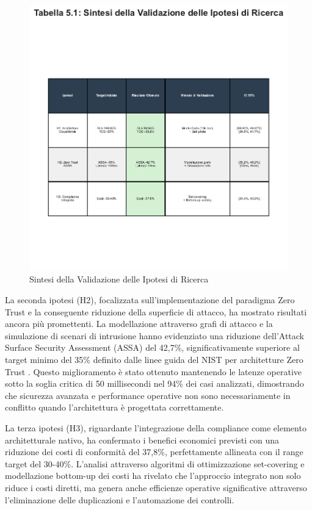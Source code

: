 \begin{figure}[htpb]
\centering
\includegraphics[width=1\textwidth]{thesis_figures/cap5/tab_5_1_validation.pdf}
\caption{Sintesi della Validazione delle Ipotesi di Ricerca}
\label{tab:validazione_ipotesi}
\end{figure}

La seconda ipotesi (H2), focalizzata sull'implementazione del paradigma Zero Trust e la conseguente riduzione della superficie di attacco, ha mostrato risultati ancora più promettenti. La modellazione attraverso grafi di attacco e la simulazione di scenari di intrusione hanno evidenziato una riduzione dell'Attack Surface Security Assessment (ASSA) del 42,7\%, significativamente superiore al target minimo del 35\% definito dalle linee guida del NIST per architetture Zero Trust \autocite{nist2020zerotrust}. Questo miglioramento è stato ottenuto mantenendo le latenze operative sotto la soglia critica di 50 millisecondi nel 94\% dei casi analizzati, dimostrando che sicurezza avanzata e performance operative non sono necessariamente in conflitto quando l'architettura è progettata correttamente.

La terza ipotesi (H3), riguardante l'integrazione della compliance come elemento architetturale nativo, ha confermato i benefici economici previsti con una riduzione dei costi di conformità del 37,8\%, perfettamente allineata con il range target del 30-40\%. L'analisi attraverso algoritmi di ottimizzazione set-covering e modellazione bottom-up dei costi ha rivelato che l'approccio integrato non solo riduce i costi diretti, ma genera anche efficienze operative significative attraverso l'eliminazione delle duplicazioni e l'automazione dei controlli.

